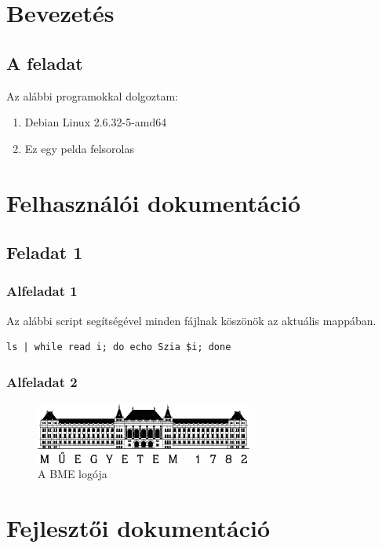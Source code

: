 
\section{Bevezetés}
\subsection{A feladat}
Az alábbi programokkal dolgoztam:
\begin{enumerate}
\item Debian Linux 2.6.32-5-amd64
\item Ez egy pelda felsorolas
\end{enumerate}

\section{Felhasználói dokumentáció}
\subsection{Feladat 1}
\subsubsection{Alfeladat 1}
Az alábbi script segítségével minden fájlnak köszönök az aktuális mappában.
\begin{lstlisting}[frame=single,float=!ht]
ls | while read i; do echo Szia $i; done
\end{lstlisting}
\subsubsection{Alfeladat 2}
\begin{figure}[h]
\begin{center}
\includegraphics[height=2cm]{figures/BMElogo.png}
\caption{A BME logója}
\label{fig:BMElogo}
\end{center}
\end{figure}

\section{Fejlesztői dokumentáció}
